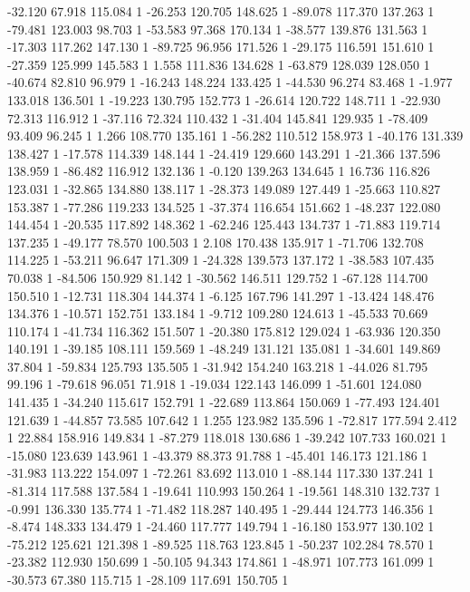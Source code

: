 	-32.120 67.918 115.084 1
	-26.253 120.705 148.625 1
	-89.078 117.370 137.263 1
	-79.481 123.003 98.703 1
	-53.583 97.368 170.134 1
	-38.577 139.876 131.563 1
	-17.303 117.262 147.130 1
	-89.725 96.956 171.526 1
	-29.175 116.591 151.610 1
	-27.359 125.999 145.583 1
	1.558 111.836 134.628 1
	-63.879 128.039 128.050 1
	-40.674 82.810 96.979 1
	-16.243 148.224 133.425 1
	-44.530 96.274 83.468 1
	-1.977 133.018 136.501 1
	-19.223 130.795 152.773 1
	-26.614 120.722 148.711 1
	-22.930 72.313 116.912 1
	-37.116 72.324 110.432 1
	-31.404 145.841 129.935 1
	-78.409 93.409 96.245 1
	1.266 108.770 135.161 1
	-56.282 110.512 158.973 1
	-40.176 131.339 138.427 1
	-17.578 114.339 148.144 1
	-24.419 129.660 143.291 1
	-21.366 137.596 138.959 1
	-86.482 116.912 132.136 1
	-0.120 139.263 134.645 1
	16.736 116.826 123.031 1
	-32.865 134.880 138.117 1
	-28.373 149.089 127.449 1
	-25.663 110.827 153.387 1
	-77.286 119.233 134.525 1
	-37.374 116.654 151.662 1
	-48.237 122.080 144.454 1
	-20.535 117.892 148.362 1
	-62.246 125.443 134.737 1
	-71.883 119.714 137.235 1
	-49.177 78.570 100.503 1
	2.108 170.438 135.917 1
	-71.706 132.708 114.225 1
	-53.211 96.647 171.309 1
	-24.328 139.573 137.172 1
	-38.583 107.435 70.038 1
	-84.506 150.929 81.142 1
	-30.562 146.511 129.752 1
	-67.128 114.700 150.510 1
	-12.731 118.304 144.374 1
	-6.125 167.796 141.297 1
	-13.424 148.476 134.376 1
	-10.571 152.751 133.184 1
	-9.712 109.280 124.613 1
	-45.533 70.669 110.174 1
	-41.734 116.362 151.507 1
	-20.380 175.812 129.024 1
	-63.936 120.350 140.191 1
	-39.185 108.111 159.569 1
	-48.249 131.121 135.081 1
	-34.601 149.869 37.804 1
	-59.834 125.793 135.505 1
	-31.942 154.240 163.218 1
	-44.026 81.795 99.196 1
	-79.618 96.051 71.918 1
	-19.034 122.143 146.099 1
	-51.601 124.080 141.435 1
	-34.240 115.617 152.791 1
	-22.689 113.864 150.069 1
	-77.493 124.401 121.639 1
	-44.857 73.585 107.642 1
	1.255 123.982 135.596 1
	-72.817 177.594 2.412 1
	22.884 158.916 149.834 1
	-87.279 118.018 130.686 1
	-39.242 107.733 160.021 1
	-15.080 123.639 143.961 1
	-43.379 88.373 91.788 1
	-45.401 146.173 121.186 1
	-31.983 113.222 154.097 1
	-72.261 83.692 113.010 1
	-88.144 117.330 137.241 1
	-81.314 117.588 137.584 1
	-19.641 110.993 150.264 1
	-19.561 148.310 132.737 1
	-0.991 136.330 135.774 1
	-71.482 118.287 140.495 1
	-29.444 124.773 146.356 1
	-8.474 148.333 134.479 1
	-24.460 117.777 149.794 1
	-16.180 153.977 130.102 1
	-75.212 125.621 121.398 1
	-89.525 118.763 123.845 1
	-50.237 102.284 78.570 1
	-23.382 112.930 150.699 1
	-50.105 94.343 174.861 1
	-48.971 107.773 161.099 1
	-30.573 67.380 115.715 1
	-28.109 117.691 150.705 1
